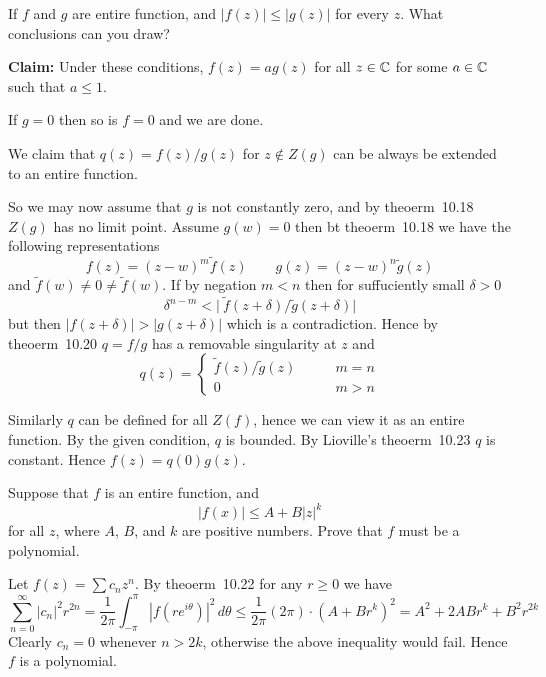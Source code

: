 \begin{enumerate}
\begin{excopy}
If $f$ and $g$ are entire function, and \(|f(z)| \leq |g(z)|\)
for every $z$. What conclusions can you draw?
\end{excopy}

\textbf{Claim:}
Under these conditions, \(f(z) = ag(z)\) for all \(z\in\mathbb{C}\) for some
\(a\in\mathbb{C}\) such that \(a\leq 1\).

If \(g = 0\) then so is \(f = 0\) and we are done.

We claim that \(q(z) = f(z)/g(z)\) for \(z\notin Z(g)\)
can be always be extended to an entire function.

So we may now assume that $g$ is not constantly zero, and by theoerm~10.18
\(Z(g)\) has no limit point.
Assume \(g(w) = 0\)
then bt theoerm~10.18 we have the following representations
\begin{equation*}
f(z) = (z-w)^m\tilde{f}(z)
\qquad
g(z) = (z-w)^n\tilde{g}(z)
\end{equation*}
and \(\tilde{f}(w) \neq 0 \neq \tilde{f}(w)\).
If by negation \(m < n\) then for suffuciently small \(\delta>0\)
\begin{equation*}
\delta^{n-m} < \bigl|\ \tilde{f}(z+\delta) / \tilde{g}(z+\delta)\bigr|
\end{equation*}
but then \(|f(z+\delta)| > |g(z+\delta)|\) which is a contradiction.
Hence by theoerm~10.20 \(q=f/g\) has a removable singularity at $z$
and
\begin{equation*}
q(z) = \left\{\begin{array}{ll}
\tilde{f}(z)/\tilde{g}(z) \qquad& m=n \\
0 & m > n
\end{array}\right.
\end{equation*}

Similarly $q$ can be defined for all \(Z(f)\),
hence we can view it as an entire function. By the given condition,
$q$ is bounded. By
Lioville's theoerm~10.23 $q$ is constant. Hence \(f(z)= q(0) g(z)\).


\begin{excopy}
Suppose that $f$ is an entire function, and
\begin{equation*}
|f(x)| \leq A + B|z|^k
\end{equation*}
for all $z$, where $A$, $B$, and $k$ are positive numbers.
Prove that $f$ must be a polynomial.
\end{excopy}

Let \(f(z) = \sum c_nz^n\). By
theoerm~10.22 for any \(r\geq 0\) we have
\begin{equation*}
\sum_{n=0}^\infty |c_n|^2 r^{2n}
= \frac{1}{2\pi}\int_{-\pi}^\pi \left| f(re^{i\theta})\right|^2\,d\theta
\leq \frac{1}{2\pi} (2\pi)\cdot(A+Br^k)^2
= A^2+2ABr^k + B^2r^{2k}
\end{equation*}
Clearly \(c_n = 0\) whenever \(n > 2k\), otherwise the above inequality
would fail. Hence $f$ is a polynomial.


\end{enumerate}
